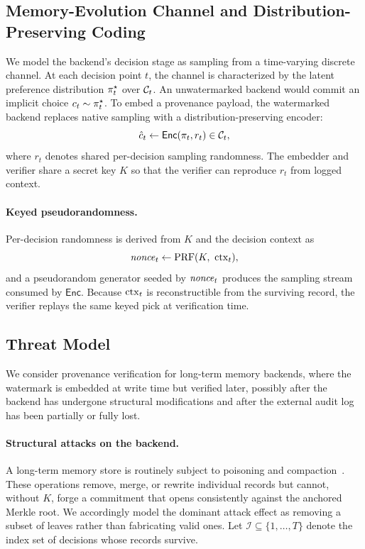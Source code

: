 \subsection{Memory-Evolution Channel and Distribution-Preserving Coding}
\label{sec:problem-channel}
We model the backend's decision stage as sampling from a time-varying
discrete channel. At each decision point $t$, the channel is characterized
by the latent preference distribution $\pi_t^\star$ over $\mathcal{C}_t$.
An unwatermarked backend would commit an implicit choice
$c_t\sim\pi_t^\star$. To embed a provenance payload, the watermarked
backend replaces native sampling with a distribution-preserving encoder:
\begin{equation}
\hat c_t \leftarrow \mathsf{Enc}(\pi_t, r_t)\in\mathcal{C}_t,
\end{equation}
where $r_t$ denotes shared per-decision sampling randomness. The embedder
and verifier share a secret key $K$ so that the verifier can reproduce
$r_t$ from logged context.

\paragraph{Keyed pseudorandomness.}
Per-decision randomness is derived from $K$ and the decision context as
\begin{equation}
\mathit{nonce}_t \leftarrow \mathrm{PRF}(K,\ \mathrm{ctx}_t),
\end{equation}
and a pseudorandom generator seeded by $\mathit{nonce}_t$ produces the sampling
stream consumed by $\mathsf{Enc}$. Because $\mathrm{ctx}_t$ is reconstructible from
the surviving record, the verifier replays the same keyed pick at
verification time.

\subsection{Threat Model}
\label{sec:problem-threat}
We consider provenance verification for long-term memory backends, where
the watermark is embedded at write time but verified later, possibly after
the backend has undergone structural modifications and after the external
audit log has been partially or fully lost.

\paragraph{Structural attacks on the backend.}
A long-term memory store is routinely subject to poisoning and
compaction~\cite{chen2024agentpoison,amemguard,memorygraft}. These
operations remove, merge, or rewrite individual records but cannot,
without $K$, forge a commitment that opens consistently against the
anchored Merkle root. We accordingly model the dominant attack effect as
removing a subset of leaves rather than fabricating valid ones. Let
$\mathcal{I}\subseteq\{1,\ldots,T\}$ denote the index set of decisions
whose records survive.

